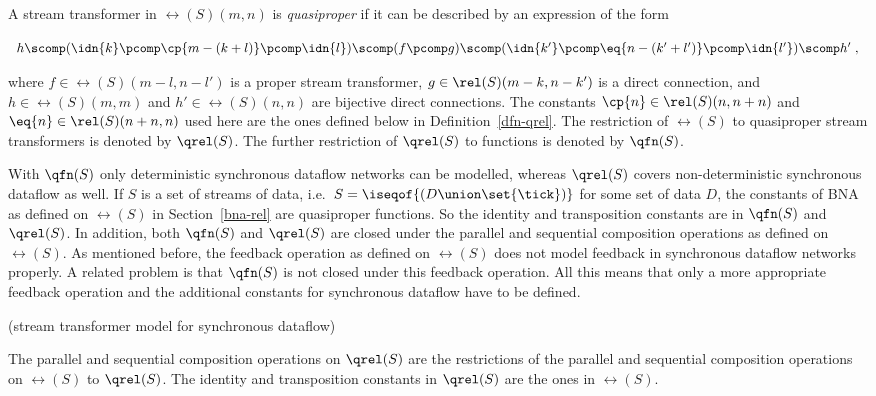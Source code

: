\documentclass[fleqn]{llncs}
\begin{document}
\noindent
A stream transformer in $\rel(S)(m,n)$ is {\em quasiproper\/}
if it can be described by an expression of the form
\begin{center}
$
\begin{array}[t]{l}
h \scomp (\idn{k} \pcomp \cp{m-(k+l)} \pcomp \idn{l}) \scomp
(f \pcomp g) \scomp
(\idn{k'} \pcomp \eq{n-(k'+l')} \pcomp \idn{l'}) \scomp h'\;,
\end{array}
$
\end{center}
where
$f  \in \rel(S)(m-l,n-l')$ is a proper stream transformer,
$g  \in \rel(S)(m-k,\linebreak[2]n-k')$ is a direct connection, and
$h  \in \rel(S)(m,m)$ and
$h' \in \rel(S)(n,n)$ are bijective direct connections.
The constants $\cp{n} \in \rel(S)(n,n+n)$ and
$\eq{n} \in \rel(S)(n+n,n)$ used here are the ones defined below in
Definition~\ref{dfn-qrel}.
The restriction of $\rel(S)$ to quasiproper stream transformers is
denoted by $\qrel(S)$.
The further restriction of $\qrel(S)$ to functions is denoted by
$\qfn(S)$.
\edfn

With $\qfn(S)$ only deterministic synchronous dataflow networks can be 
modelled, whereas $\qrel(S)$ covers non-deterministic synchronous 
dataflow as well.
If $S$ is a set of streams of data, i.e.\
$S = \iseqof{(D \union \set{\tick})}$ for some set of data $D$, the
constants of BNA as defined on $\rel(S)$ in Section~\ref{bna-rel} are
quasiproper functions.
So the identity and transposition constants are in $\qfn(S)$ and
$\qrel(S)$.
In addition, both $\qfn(S)$ and $\qrel(S)$ are closed under the parallel
and sequential composition operations as defined on $\rel(S)$.
As mentioned before, the feedback operation as defined on $\rel(S)$
does not model feedback in synchronous dataflow networks properly.
A related problem is that $\qfn(S)$ is not closed under this feedback
operation.
All this means that only a more appropriate feedback operation and the
additional constants for synchronous dataflow have to be defined.

\bdfn (stream transformer model for synchronous dataflow)
\label{dfn-qrel}

\noindent
The parallel and sequential composition operations on $\qrel(S)$ are the
restrictions of the parallel and sequential composition operations on
$\rel(S)$ to $\qrel(S)$.
The identity and transposition constants in $\qrel(S)$ are the ones in
$\rel(S)$.
\end{document}
